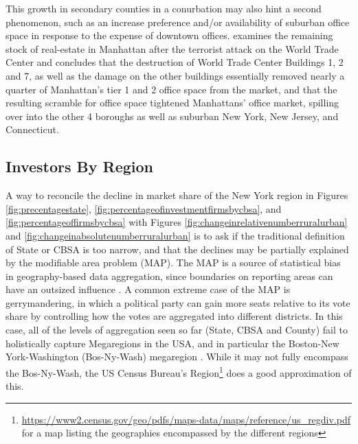 This growth in secondary counties in a conurbation may also hint a second phenomenon, such as an increase preference and/or availability of suburban office space in response to the expense of downtown offices.  \cite{Pohl2004} examines the remaining stock of real-estate in Manhattan after the terrorist attack on the World Trade Center and concludes that the destruction of World Trade Center Buildings 1, 2 and 7, as well as the damage on the other buildings essentially removed nearly a quarter of Manhattan's tier 1 and 2 office space from the market, and that the resulting scramble for office space tightened Manhattans' office market, spilling over into the other 4 boroughs as well as suburban New York, New Jersey, and Connecticut.  




\subsection{Investors By Region}

A way to reconcile the decline in market share of the New York region in Figures \ref{fig:precentagestate}, \ref{fig:percentageofinvestmentfirmsbycbsa}, and \ref{fig:percentageoffirmsbycbsa}  with Figures \ref{fig:changeinrelativenumberruralurban} and \ref{fig:changeinabsolutenumberruralurban} is to ask if the traditional definition of State or CBSA is too narrow, and that the declines may be partially explained by the modifiable area problem (MAP).  The MAP is a source of statistical bias in geography-based data aggregation, since boundaries on reporting areas can have an outsized influence \citep{Fotheringham1991}.  A common extreme case of the MAP is gerrymandering, in which a political party can gain more seats relative to its vote share by controlling how the votes are aggregated into different districts.  In this case, all of the levels of aggregation seen so far (State, CBSA and County) fail to holistically capture Megaregions in the USA, and in particular the Boston-New York-Washington (Bos-Ny-Wash) megaregion  \citep{lang2007america}. While it may not fully encompass the Bos-Ny-Wash, the US Census Bureau's Region\footnote{\url{https://www2.census.gov/geo/pdfs/maps-data/maps/reference/us_regdiv.pdf} for a map listing the geographies encompassed by the different regions} does a good approximation of this.  

\label{Atlanta}


